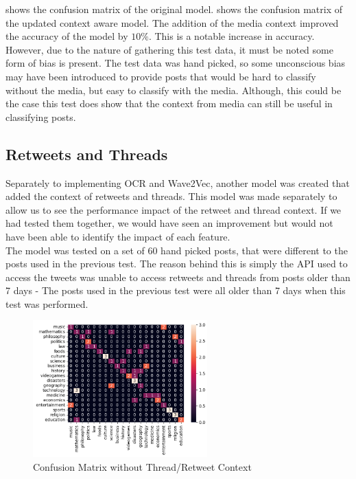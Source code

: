  shows the confusion matrix of the original model.  shows the confusion matrix of the
updated context aware model. The addition of the media context improved the accuracy of the model by $10\%$. This is a notable increase
in accuracy. However, due to the nature of gathering this test data, it must be noted some form of bias is present. The test data was
hand picked, so some unconscious bias may have been introduced to provide posts that would be hard to classify without the media,
but easy to classify with the media. Although, this could be the case this test does show that the context from media can still be useful
in classifying posts.\\
\subsection{Retweets and Threads}
Separately to implementing OCR and Wave2Vec, another model was created that added the context of retweets and threads. This model was
made separately to allow us to see the performance impact of the retweet and thread context. If we had tested them together, we would
have seen an improvement but would not have been able to identify the impact of each feature.\\
The model was tested on a set of 60 hand picked posts, that were different to the posts used in the previous test. The reason behind
this is simply the API used to access the tweets was unable to access retweets and threads from posts older than 7 days - The posts
used in the previous test were all older than 7 days when this test was performed.
\begin{figure}[hbtp]
    \centering
    \includegraphics[width=0.6\textwidth]{../images/confusion/RoBERTa-nothread-20.png}
    \caption{Confusion Matrix without Thread/Retweet Context}
    \label{fig:confusion2}
\end{figure}

